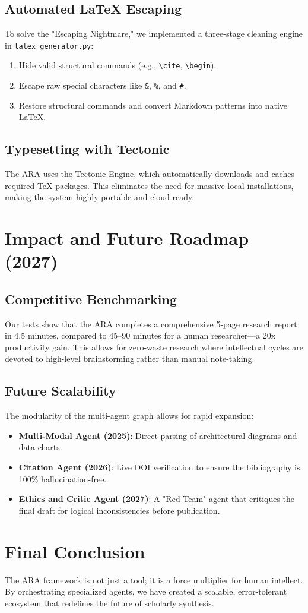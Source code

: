 \documentclass[11pt,a4paper]{article}
\begin{document}
\subsection{Automated LaTeX Escaping}
To solve the "Escaping Nightmare," we implemented a three-stage cleaning engine in \texttt{latex\_generator.py}:
\begin{enumerate}
    \item Hide valid structural commands (e.g., \texttt{\textbackslash{}cite}, \texttt{\textbackslash{}begin}).
    \item Escape raw special characters like \texttt{\&}, \texttt{\%}, and \texttt{\#}.
    \item Restore structural commands and convert Markdown patterns into native LaTeX.
\end{enumerate}

\subsection{Typesetting with Tectonic}
The ARA uses the Tectonic Engine, which automatically downloads and caches required TeX packages. This eliminates the need for massive local installations, making the system highly portable and cloud-ready.

\section{Impact and Future Roadmap (2027)}

\subsection{Competitive Benchmarking}
Our tests show that the ARA completes a comprehensive 5-page research report in 4.5 minutes, compared to 45--90 minutes for a human researcher---a 20x productivity gain. This allows for zero-waste research where intellectual cycles are devoted to high-level brainstorming rather than manual note-taking.

\subsection{Future Scalability}
The modularity of the multi-agent graph allows for rapid expansion:
\begin{itemize}
    \item \textbf{Multi-Modal Agent (2025)}: Direct parsing of architectural diagrams and data charts.
    \item \textbf{Citation Agent (2026)}: Live DOI verification to ensure the bibliography is 100\% hallucination-free.
    \item \textbf{Ethics and Critic Agent (2027)}: A "Red-Team" agent that critiques the final draft for logical inconsistencies before publication.
\end{itemize}

\section{Final Conclusion}
The ARA framework is not just a tool; it is a force multiplier for human intellect. By orchestrating specialized agents, we have created a scalable, error-tolerant ecosystem that redefines the future of scholarly synthesis.
\end{document}
